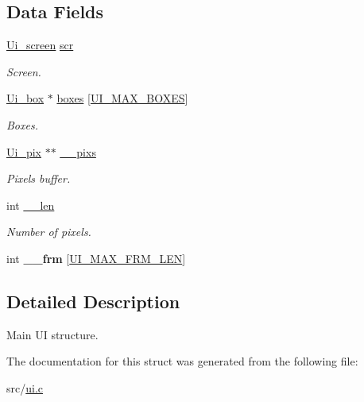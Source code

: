 \subsection*{Data Fields}
\begin{DoxyCompactItemize}
\item 
\mbox{\label{struct__Ui_abd7c2a78bbdbe0e91a47a1461660b747}} 
\hyperlink{struct__Ui__screen}{Ui\+\_\+screen} \hyperlink{struct__Ui_abd7c2a78bbdbe0e91a47a1461660b747}{scr}
\begin{DoxyCompactList}\small\item\em Screen. \end{DoxyCompactList}\item 
\mbox{\label{struct__Ui_ab4d33275d1afe8817a640653ab4b6848}} 
\hyperlink{struct__Ui__box}{Ui\+\_\+box} $\ast$ \hyperlink{struct__Ui_ab4d33275d1afe8817a640653ab4b6848}{boxes} \mbox{[}\hyperlink{ui_8c_a1be73fb0e5253951bdb7f2a4bd6a1524}{U\+I\+\_\+\+M\+A\+X\+\_\+\+B\+O\+X\+ES}\mbox{]}
\begin{DoxyCompactList}\small\item\em Boxes. \end{DoxyCompactList}\item 
\mbox{\label{struct__Ui_a11af896bffe4bdbeca5ca871f7a9b7f0}} 
\hyperlink{struct__Ui__pix}{Ui\+\_\+pix} $\ast$$\ast$ \hyperlink{struct__Ui_a11af896bffe4bdbeca5ca871f7a9b7f0}{\+\_\+\+\_\+pixs}
\begin{DoxyCompactList}\small\item\em Pixels buffer. \end{DoxyCompactList}\item 
\mbox{\label{struct__Ui_a368b423615ed2b6852c1ca99fd6351ce}} 
int \hyperlink{struct__Ui_a368b423615ed2b6852c1ca99fd6351ce}{\+\_\+\+\_\+len}
\begin{DoxyCompactList}\small\item\em Number of pixels. \end{DoxyCompactList}\item 
\mbox{\label{struct__Ui_a2e557f044026b3a80e8a4a60d43a31cd}} 
int {\bfseries \+\_\+\+\_\+frm} \mbox{[}\hyperlink{ui_8c_aab208380ff579bef5fd8b91fa0c0215a}{U\+I\+\_\+\+M\+A\+X\+\_\+\+F\+R\+M\+\_\+\+L\+EN}\mbox{]}
\end{DoxyCompactItemize}


\subsection{Detailed Description}
Main UI structure. 

The documentation for this struct was generated from the following file\+:\begin{DoxyCompactItemize}
\item 
src/\hyperlink{ui_8c}{ui.\+c}\end{DoxyCompactItemize}
